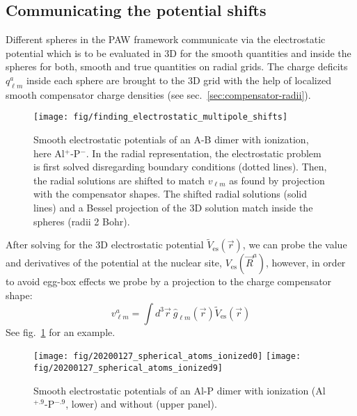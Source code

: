\documentclass[oribibl]{llncs}
\newcommand{\um}[1]{_{\mathrm{#1}}}
\begin{document}
\subsection{Communicating the potential shifts}\label{sec:multipole-shifts}
Different spheres in the PAW framework communicate via the electrostatic
potential which is to be evaluated in 3D for the smooth quantities
and inside the spheres for both, smooth and true quantities on radial grids.
The charge deficits $q^a_{\ell m}$ inside each sphere are
brought to the 3D grid with the help of localized smooth compensator charge densities 
(see sec.~\ref{sec:compensator-radii}).
%
\begin{figure}
  \begin{minipage}[c]{.990\textwidth}
	\texttt{[image: fig/finding\_electrostatic\_multipole\_shifts]} %
  \end{minipage}\hfill
  \begin{minipage}[c]{.009\textwidth}
  \end{minipage}
  \label{fig:multipole-shifts}
  \caption{Smooth electrostatic potentials of an A-B dimer with ionization, here Al$^+$-P$^-$.
  In the radial representation, the electrostatic problem is first solved disregarding boundary conditions (dotted lines).
  Then, the radial solutions are shifted to match $v_{\ell m}$ as found by projection with the compensator shapes.
  The shifted radial solutions (solid lines) and a Bessel projection of the 3D solution match inside the spheres (radii 2 Bohr).}
\end{figure}
%
%
After solving for the 3D electrostatic potential $\tilde V\um{es}(\vec r)$,
we can probe the value and derivatives of the potential at the nuclear site, $V\um{es}(\vec R^a)$,
however, in order to avoid egg-box effects we
probe by a projection to the charge compensator shape:
$$ v^a_{\ell m} = \int d^3 \vec r \  \hat g_{\ell m}(\vec r) \tilde V\um{es}(\vec r) $$
See fig.~\ref{fig:multipole-shifts} for an example.

\begin{figure}
  \begin{minipage}[c]{.990\textwidth}
	\texttt{[image: fig/20200127\_spherical\_atoms\_ionized0]} %
	\texttt{[image: fig/20200127\_spherical\_atoms\_ionized9]} %
  \end{minipage}\hfill
  \begin{minipage}[c]{.009\textwidth}
  \end{minipage}
  \label{fig:ionized-spherical-atoms-AlP-dimer}
  \caption{Smooth electrostatic potentials of an Al-P dimer with ionization (Al$^{+.9}$-P$^{-.9}$, lower) and without (upper panel). }
\end{figure}
\end{document}
